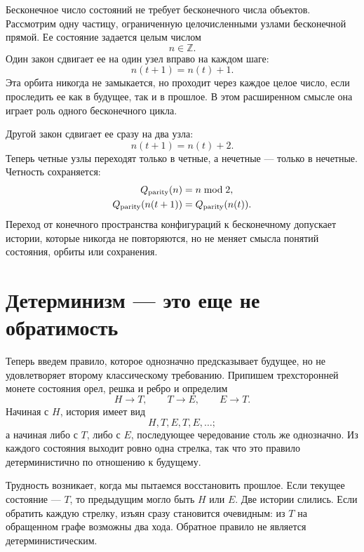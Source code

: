 Бесконечное число состояний не требует бесконечного числа объектов. Рассмотрим одну частицу, ограниченную целочисленными узлами бесконечной прямой. Ее состояние задается целым числом
\[
  n\in\mathbb Z.
\]
Один закон сдвигает ее на один узел вправо на каждом шаге:
\begin{equation}
  n(t+1)=n(t)+1.
  \label{eq:lattice-one}
\end{equation}
Эта орбита никогда не замыкается, но проходит через каждое целое число, если проследить ее как в будущее, так и в прошлое. В этом расширенном смысле она играет роль одного бесконечного цикла.

Другой закон сдвигает ее сразу на два узла:
\begin{equation}
  n(t+1)=n(t)+2.
  \label{eq:lattice-two}
\end{equation}
Теперь четные узлы переходят только в четные, а нечетные — только в нечетные. Четность сохраняется:
\begin{equation}
  \begin{aligned}
    Q_{\rm parity}(n)&=n\bmod 2,\\
    Q_{\rm parity}(n(t+1))&=Q_{\rm parity}(n(t)).
  \end{aligned}
\end{equation}
Переход от конечного пространства конфигураций к бесконечному допускает истории, которые никогда не повторяются, но не меняет смысла понятий состояния, орбиты или сохранения.

\section{Детерминизм — это еще не обратимость}

Теперь введем правило, которое однозначно предсказывает будущее, но не удовлетворяет второму классическому требованию. Припишем трехсторонней монете состояния орел, решка и ребро и определим
\begin{equation}
  H\to T,
  \qquad
  T\to E,
  \qquad
  E\to T.
  \label{eq:nonreversible-map}
\end{equation}
Начиная с \(H\), история имеет вид
\[
  H,T,E,T,E,\ldots;
\]
а начиная либо с \(T\), либо с \(E\), последующее чередование столь же однозначно. Из каждого состояния выходит ровно одна стрелка, так что это правило детерминистично по отношению к будущему.

Трудность возникает, когда мы пытаемся восстановить прошлое. Если текущее состояние — \(T\), то предыдущим могло быть \(H\) или \(E\). Две истории слились. Если обратить каждую стрелку, изъян сразу становится очевидным: из \(T\) на обращенном графе возможны два хода. Обратное правило не является детерминистическим.

